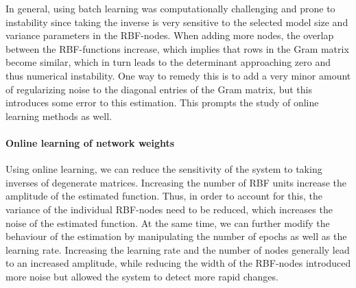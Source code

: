 \documentclass[a4paper]{article}
\begin{document}
In general, using batch learning was computationally challenging and prone to instability since taking the inverse is very sensitive to the selected model size and variance parameters in the RBF-nodes. When adding more nodes, the overlap between the RBF-functions increase, which implies that rows in the Gram matrix become similar, which in turn leads to the determinant approaching zero and thus numerical instability. One way to remedy this is to add a very minor amount of regularizing noise to the diagonal entries of the Gram matrix, but this introduces some error to this estimation. This prompts the study of online learning methods as well.
\paragraph{Online learning of network weights}
Using online learning, we can reduce the sensitivity of the system to taking inverses of degenerate matrices. Increasing the number of RBF units increase the amplitude of the estimated function. Thus, in order to account for this, the variance of the individual RBF-nodes need to be reduced, which increases the noise of the estimated function. At the same time, we can further modify the behaviour of the estimation by manipulating the number of epochs as well as the learning rate. Increasing the learning rate and the number of nodes generally lead to an increased amplitude, while reducing the width of the RBF-nodes introduced more noise but allowed the system to detect more rapid changes. 
\end{document}
